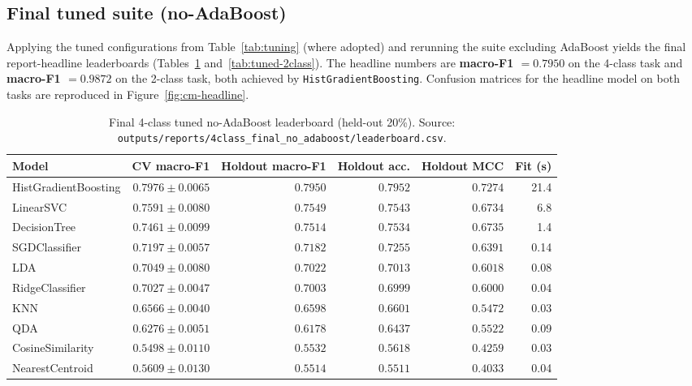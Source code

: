 \documentclass[11pt,a4paper]{article}
\begin{document}
\subsection{Final tuned suite (no-AdaBoost)}
\label{sec:tuned-final}

Applying the tuned configurations from Table~\ref{tab:tuning} (where adopted)
and rerunning the suite excluding AdaBoost yields the final
report-headline leaderboards (Tables~\ref{tab:tuned-4class}
and~\ref{tab:tuned-2class}). The headline numbers are
\textbf{macro-F1 $=0.7950$} on the 4-class task and
\textbf{macro-F1 $=0.9872$} on the 2-class task, both achieved by
\texttt{HistGradientBoosting}. Confusion matrices for the headline model
on both tasks are reproduced in Figure~\ref{fig:cm-headline}.

\begin{table}[H]
\centering
\caption{Final 4-class tuned no-AdaBoost leaderboard (held-out 20\%). Source:
\texttt{outputs/reports/4class\_final\_no\_adaboost/leaderboard.csv}.}
\label{tab:tuned-4class}
\small
\begin{tabular}{lrrrrr}
\toprule
Model & CV macro-F1 & Holdout macro-F1 & Holdout acc. & Holdout MCC & Fit (s) \\
\midrule
HistGradientBoosting & $0.7976\pm0.0065$ & $\mathbf{0.7950}$ & $0.7952$ & $0.7274$ & 21.4 \\
LinearSVC            & $0.7591\pm0.0080$ & $0.7549$ & $0.7543$ & $0.6734$ & 6.8 \\
DecisionTree         & $0.7461\pm0.0099$ & $0.7514$ & $0.7534$ & $0.6735$ & 1.4 \\
SGDClassifier        & $0.7197\pm0.0057$ & $0.7182$ & $0.7255$ & $0.6391$ & 0.14 \\
LDA                  & $0.7049\pm0.0080$ & $0.7022$ & $0.7013$ & $0.6018$ & 0.08 \\
RidgeClassifier      & $0.7027\pm0.0047$ & $0.7003$ & $0.6999$ & $0.6000$ & 0.04 \\
KNN                  & $0.6566\pm0.0040$ & $0.6598$ & $0.6601$ & $0.5472$ & 0.03 \\
QDA                  & $0.6276\pm0.0051$ & $0.6178$ & $0.6437$ & $0.5522$ & 0.09 \\
CosineSimilarity     & $0.5498\pm0.0110$ & $0.5532$ & $0.5618$ & $0.4259$ & 0.03 \\
NearestCentroid      & $0.5609\pm0.0130$ & $0.5514$ & $0.5511$ & $0.4033$ & 0.04 \\
\bottomrule
\end{tabular}
\end{table}
\end{document}
